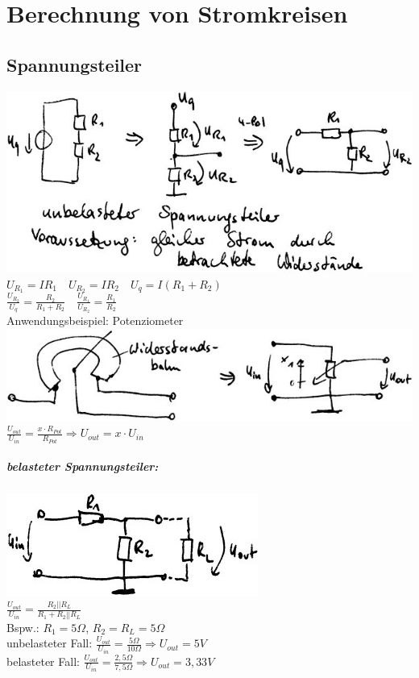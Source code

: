 \chapter{Berechnung von Stromkreisen}

\section{Spannungsteiler}

\includegraphics[scale=1.5]{Abbildungen/ABB209}\\
$U_{R_1}=IR_1 \quad U_{R_2}=IR_2 \quad U_q= I(R_1+R_2)$\\
$\frac{U_{R_2}}{U_q}=\frac{R_2}{R_1+R_2} \quad \frac{U_{R_1}}{U_{R_2}}=\frac{R_1}{R_2}$\\
Anwendungsbeispiel: Potenziometer\\
\includegraphics[scale=1.5]{Abbildungen/ABB210}\\
$\frac{U_{out}}{U_{in}}=\frac{x\cdot R_{Pot}}{R_{Pot}}\Rightarrow U_{out} = x \cdot U_{in}$
\paragraph{belasteter Spannungsteiler:}\parskp
\includegraphics[scale=1.5]{Abbildungen/ABB211}\\
$\frac{U_{out}}{U_{in}}=\frac{R_2||R_L}{R_1+R_2||R_L}$\\
Bspw.: $R_1=5 \Omega$, $R_2=R_L=5 \Omega$\\
unbelasteter Fall: $\frac{U_{out}}{U_{in}}=\frac{5 \Omega}{10 \Omega} \Rightarrow U_{out}=5V$\\
belasteter Fall: $\frac{U_{out}}{U_{in}}=\frac{2,5 \Omega}{7,5 \Omega}\Rightarrow U_{out}=3,33V$

